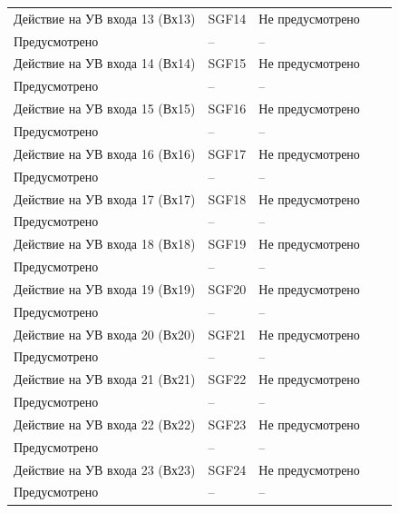\begin{longtable}{|>{\centering\arraybackslash}m{5.3cm}|>{\centering\arraybackslash}m{3.3cm}|>{\centering\arraybackslash}m{4.2cm}|>{\centering\arraybackslash}m{1.8cm}|>{\centering\arraybackslash}m{1cm}|}
\hline
\centering Действие на УВ входа 13 (Вх13)  & \centering SGF14 & \centering Не предусмотрено \\ Предусмотрено & \centering -- & \centering \arraybackslash -- \\
\hline
\centering Действие на УВ входа 14 (Вх14)  & \centering SGF15 & \centering Не предусмотрено \\ Предусмотрено & \centering -- & \centering \arraybackslash -- \\
\hline
\centering Действие на УВ входа 15 (Вх15)  & \centering SGF16 & \centering Не предусмотрено \\ Предусмотрено & \centering -- & \centering \arraybackslash -- \\
\hline
\centering Действие на УВ входа 16 (Вх16)  & \centering SGF17 & \centering Не предусмотрено \\ Предусмотрено & \centering -- & \centering \arraybackslash -- \\
\hline
\centering Действие на УВ входа 17 (Вх17)  & \centering SGF18 & \centering Не предусмотрено \\ Предусмотрено & \centering -- & \centering \arraybackslash -- \\
\hline
\centering Действие на УВ входа 18 (Вх18)  & \centering SGF19 & \centering Не предусмотрено \\ Предусмотрено & \centering -- & \centering \arraybackslash -- \\
\hline
\centering Действие на УВ входа 19 (Вх19)  & \centering SGF20 & \centering Не предусмотрено \\ Предусмотрено & \centering -- & \centering \arraybackslash -- \\
\hline
\centering Действие на УВ входа 20 (Вх20)  & \centering SGF21 & \centering Не предусмотрено \\ Предусмотрено & \centering -- & \centering \arraybackslash -- \\
\hline
\centering Действие на УВ входа 21 (Вх21)  & \centering SGF22 & \centering Не предусмотрено \\ Предусмотрено & \centering -- & \centering \arraybackslash -- \\
\hline
\centering Действие на УВ входа 22 (Вх22)  & \centering SGF23 & \centering Не предусмотрено \\ Предусмотрено & \centering -- & \centering \arraybackslash -- \\
\hline
\centering Действие на УВ входа 23 (Вх23)  & \centering SGF24 & \centering Не предусмотрено \\ Предусмотрено & \centering -- & \centering \arraybackslash -- \\

\end{longtable}
